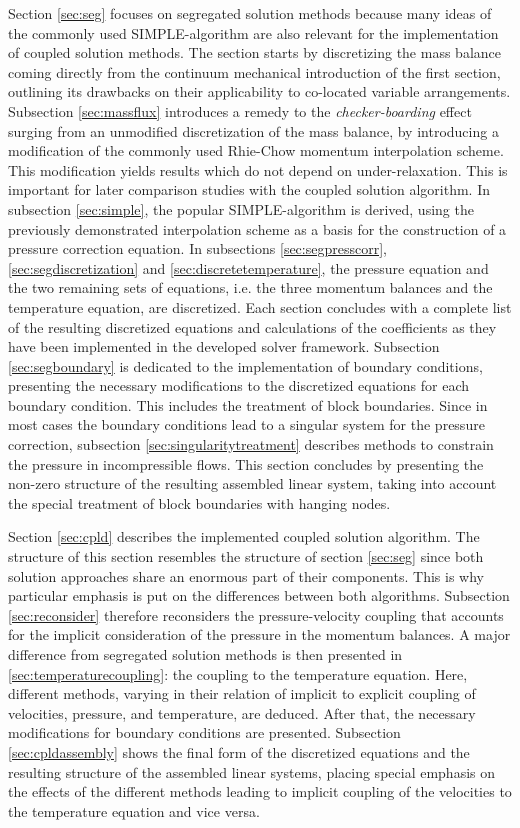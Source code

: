 Section \ref{sec:seg} focuses on segregated solution methods because many ideas of the commonly used SIMPLE-algorithm are also relevant for the implementation of coupled solution methods. The section starts by discretizing the mass balance coming directly from the continuum mechanical introduction of the first section, outlining its drawbacks on their applicability to co-located variable arrangements. Subsection \ref{sec:massflux} introduces a remedy to the \emph{checker-boarding} effect surging from an unmodified discretization of the mass balance, by introducing a modification of the commonly used Rhie-Chow \cite{rhie82} momentum interpolation scheme. This modification yields results which do not depend on under-relaxation. This is important for later comparison studies with the coupled solution algorithm. In subsection \ref{sec:simple}, the popular SIMPLE-algorithm is derived, using the previously demonstrated interpolation scheme as a basis for the construction of a pressure correction equation. In subsections \ref{sec:segpresscorr}, \ref{sec:segdiscretization} and \ref{sec:discretetemperature}, the pressure equation and the two remaining sets of equations, i.e. the three momentum balances and the temperature equation, are discretized. Each section concludes with a complete list of the resulting discretized equations and calculations of the coefficients as they have been implemented in the developed solver framework. Subsection \ref{sec:segboundary} is dedicated to the implementation of boundary conditions, presenting the necessary modifications to the discretized equations for each boundary condition. This includes the treatment of block boundaries. Since in most cases the boundary conditions lead to a singular system for the pressure correction, subsection \ref{sec:singularitytreatment} describes methods to constrain the pressure in incompressible flows. This section concludes by presenting the non-zero structure of the resulting assembled linear system, taking into account the special treatment of block boundaries with hanging nodes.

Section \ref{sec:cpld} describes the implemented coupled solution algorithm. The structure of this section resembles the structure of section \ref{sec:seg} since both solution approaches share an enormous part of their components. This is why particular emphasis is put on the differences between both algorithms. Subsection \ref{sec:reconsider} therefore reconsiders the pressure-velocity coupling that accounts for the implicit consideration of the pressure in the momentum balances. A major difference from segregated solution methods is then presented in \ref{sec:temperaturecoupling}: the coupling to the temperature equation. Here, different methods, varying in their relation of implicit to explicit coupling of velocities, pressure, and temperature, are deduced. After that, the necessary modifications for boundary conditions are presented. Subsection \ref{sec:cpldassembly} shows the final form of the discretized equations and the resulting structure of the assembled linear systems, placing special emphasis on the effects of the different methods leading to implicit coupling of the velocities to the temperature equation and vice versa.

